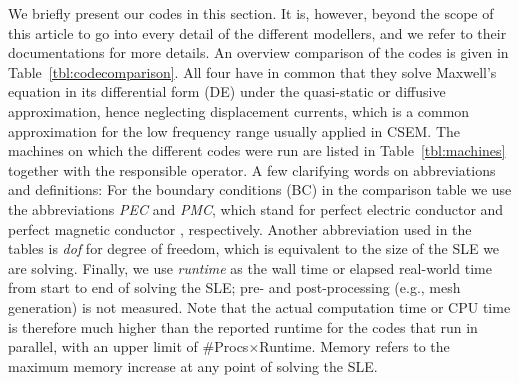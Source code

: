\documentclass[onecolumn,extra,camera]{gji}
\begin{document}
We briefly present our codes in this section. It is, however, beyond the scope of this article to go into every detail of the different modellers, and we refer to their documentations for more details. An overview comparison of the codes is given in Table~\ref{tbl:codecomparison}. All four have in common that they solve Maxwell's equation in its differential form (DE) under the quasi-static or diffusive approximation, hence neglecting displacement currents, which is a common approximation for the low frequency range usually applied in CSEM. The machines on which the different codes were run are listed in Table~\ref{tbl:machines} together with the responsible operator. A few clarifying words on abbreviations and definitions: For the boundary conditions (BC) in the comparison table we use the abbreviations \emph{PEC} and \emph{PMC}, which stand for perfect electric conductor
and perfect magnetic conductor%
, respectively. Another abbreviation used in the tables is \emph{dof} for degree of freedom, which is equivalent to the size of the SLE we are solving. Finally, we use \emph{runtime} as the wall time or elapsed real-world time from start to end of solving the SLE; pre- and post-processing (e.g., mesh generation) is not measured. Note that the actual computation time or CPU time is therefore much higher than the reported runtime for the codes that run in parallel, with an upper limit of \#Procs$\times$Runtime. Memory refers to the maximum memory increase at any point of solving the SLE.
\end{document}
